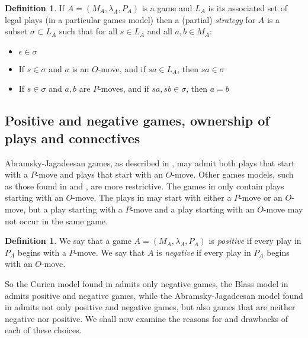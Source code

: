 \documentclass[11pt]{article} %
\theoremstyle{plain} %
\theoremstyle{definition} %
\newtheorem{definition}[theorem]{Definition}
\theoremstyle{note}
\theoremstyle{exercisestyle}
\newcommand{\emptyplay}{\epsilon}
\begin{document}
\begin{definition}
  If $A=(M_A,\lambda_A,P_A)$ is a game and $L_A$ is its associated set of legal plays (in a particular games model) then a (partial) \emph{strategy} for $A$ is a subset $\sigma\subset L_A$ such that for all $s\in L_A$ and all $a, b\in M_A$:
  \begin{itemize}
    \item $\emptyplay\in\sigma$
    \item If $s\in\sigma$ and $a$ is an $O$-move, and if $sa\in L_A$, then $sa\in\sigma$
    \item If $s\in\sigma$ and $a,b$ are $P$-moves, and if $sa,sb\in\sigma$, then $a=b$
  \end{itemize}
\end{definition}

\subsection{Positive and negative games, ownership of plays and connectives}

Abramsky-Jagadeesan games, as described in \cite{abramskyjagadeesangames}, may admit both plays that start with a $P$-move and plays that start with an $O$-move.  Other games models, such as those found in \cite{blassgames} and \cite{curiengames}, are more restrictive.  The games in \cite{curiengames} only contain plays starting with an $O$-move.  The plays in \cite{blassgames} may start with either a $P$-move or an $O$-move, but a play starting with a $P$-move and a play starting with an $O$-move may not occur in the same game.

\begin{definition}
  We say that a game $A=(M_A,\lambda_A,P_A)$ is \emph{positive} if every play in $P_A$ begins with a $P$-move.
  We say that $A$ is \emph{negative} if every play in $P_A$ begins with an $O$-move.
\end{definition}

So the Curien model found in \cite{curiengames} admits only negative games, the Blass model in \cite{blassgames} admits positive and negative games, while the Abramsky-Jagadeesan model found in \cite{abramskyjagadeesangames} admits not only positive and negative games, but also games that are neither negative nor positive.  We shall now examine the reasons for and drawbacks of each of these choices.
\end{document}
